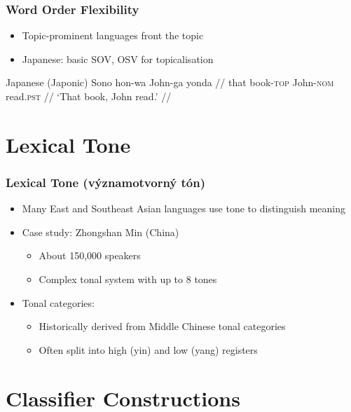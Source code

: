 \documentclass{beamer}
\begin{document}
\begin{frame}
\frametitle{Word Order Flexibility}
\begin{itemize}
\item Topic-prominent languages front the topic
\item Japanese: basic SOV, OSV for topicalisation
\end{itemize}
\begin{exampleblock}{Japanese (Japonic)}
  \ex
  \begingl
\gla Sono hon-wa John-ga yonda //
\glb that book-\textsc{top} John-\textsc{nom} read.\textsc{pst} //
\glft `That book, John read.' //
\endgl
\xe
\end{exampleblock}
\end{frame}




\section{Lexical Tone}

\begin{frame}
\frametitle{Lexical Tone (významotvorný tón)}
\begin{itemize}
\item Many East and Southeast Asian languages use tone to distinguish meaning
\item Case study: Zhongshan Min (China)
  \begin{itemize}
  \item About 150,000 speakers
  \item Complex tonal system with up to 8 tones
  \end{itemize}
\item Tonal categories:
  \begin{itemize}
  \item Historically derived from Middle Chinese tonal categories
  \item Often split into high (yin) and low (yang) registers
  \end{itemize}
\end{itemize}
\end{frame}

\section{Classifier Constructions}
\end{document}
